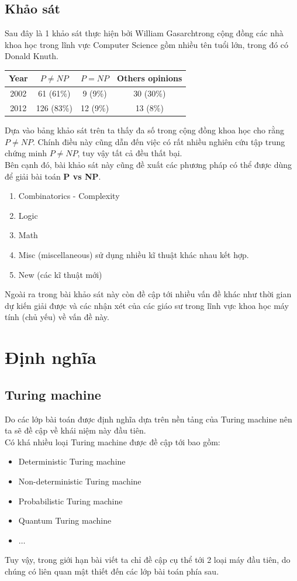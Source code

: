 \documentclass[a4paper 14pt]{article}
\begin{document}
		\subsection{Khảo sát}
			Sau đây là 1 khảo sát thực hiện bởi  William Gasarch\footnotemark trong cộng đồng các nhà khoa học trong lĩnh vực Computer Science gồm nhiều tên tuổi lớn, trong đó có Donald Knuth. \cite{Poll}
			\begin{table}[H]
				\begin{tabular}{|c|c|c|c|}
					\hline
					Year & $P \neq NP$ & $P = NP$ & Others opinions\\ \hline
					2002 & 61 (61\%) & 9 (9\%) & 30 (30\%)\\ \hline
					2012 & 126 (83\%) & 12 (9\%) & 13 (8\%)\\ \hline
				\end{tabular}
			\end{table}	
			Dựa vào bảng khảo sát trên ta thấy đa số trong cộng đồng khoa học cho rằng $P \neq NP$. Chính điều này cũng dẫn đến việc có rất nhiều nghiên cứu tập trung chứng minh $P \neq NP$, tuy vậy tất cả đều thất bại.\\
			Bên cạnh đó, bài khảo sát này cũng đề xuất các phương pháp có thể được dùng để giải bài toán \textbf{P vs NP}.
			\begin{enumerate}
				\item Combinatorics - Complexity
				\item Logic
				\item Math
				\item Misc (miscellaneous) sử dụng nhiều kĩ thuật khác nhau kết hợp.
				\item New (các kĩ thuật mới)
			\end{enumerate}
			Ngoài ra trong bài khảo sát này còn đề cập tới nhiều vấn đề khác như thời gian dự kiến giải được và các nhận xét của các giáo sư trong lĩnh vực khoa học máy tính (chủ yếu) về vấn đề này.
	\section{Định nghĩa}
		\subsection{Turing machine}
			Do các lớp bài toán được định nghĩa dựa trên nền tảng của Turing machine nên ta sẽ đề cập về khái niệm này đầu tiên.\\
			Có khá nhiều loại Turing machine được đề cập tới bao gồm:\\
			\begin{itemize}
				\item Deterministic Turing machine
				\item Non-deterministic Turing machine
				\item Probabilistic Turing machine
				\item Quantum Turing machine
				\item $\hdots$
			\end{itemize}
			Tuy vậy, trong giới hạn bài viết ta chỉ đề cập cụ thể tới 2 loại máy đầu tiên, do chúng có liên quan mật thiết đến các lớp bài toán phía sau.
\end{document}
